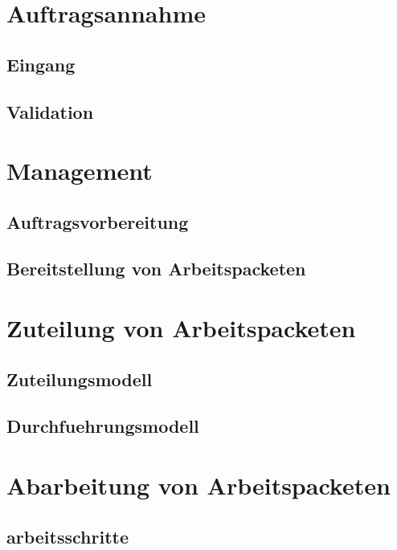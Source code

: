 \section{Auftragsannahme}
\subsection{Eingang}
\subsection{Validation}

\section{Management}
\subsection{Auftragsvorbereitung}
\subsection{Bereitstellung von Arbeitspacketen}


\section{Zuteilung von Arbeitspacketen}
\subsection{Zuteilungsmodell}
\subsection{Durchfuehrungsmodell}


\section{Abarbeitung von Arbeitspacketen}
\subsection{arbeitsschritte}
